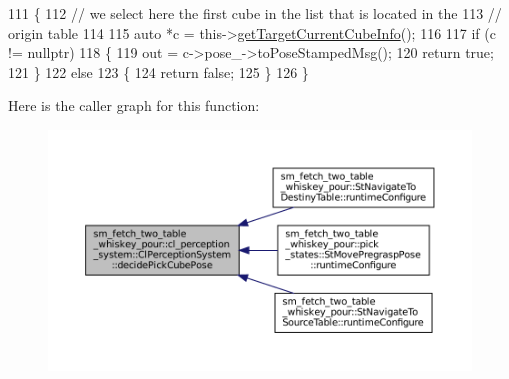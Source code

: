 \begin{DoxyCode}
111             \{
112                 \textcolor{comment}{// we select here the first cube in the list that is located in the}
113                 \textcolor{comment}{// origin table}
114 
115                 \textcolor{keyword}{auto} *c = this->\hyperlink{classsm__fetch__two__table__whiskey__pour_1_1cl__perception__system_1_1ClPerceptionSystem_a09899882cdea9c265e98881bb903882b}{getTargetCurrentCubeInfo}();
116 
117                 \textcolor{keywordflow}{if} (c != \textcolor{keyword}{nullptr})
118                 \{
119                     out = c->pose\_->toPoseStampedMsg();
120                     \textcolor{keywordflow}{return} \textcolor{keyword}{true};
121                 \}
122                 \textcolor{keywordflow}{else}
123                 \{
124                     \textcolor{keywordflow}{return} \textcolor{keyword}{false};
125                 \}
126             \}
\end{DoxyCode}
Here is the caller graph for this function\+:
\nopagebreak
\begin{figure}[H]
\begin{center}
\leavevmode
\includegraphics[width=350pt]{classsm__fetch__two__table__whiskey__pour_1_1cl__perception__system_1_1ClPerceptionSystem_a99a0106b684b9e8b3751906388be478d_icgraph}
\end{center}
\end{figure}
\mbox{\label{classsm__fetch__two__table__whiskey__pour_1_1cl__perception__system_1_1ClPerceptionSystem_a803c5d30981b6368e854dd9e8972f129}} 
